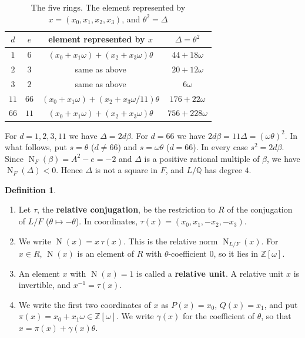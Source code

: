 \documentclass[a4paper,11pt]{article}
\theoremstyle{plain}
\theoremstyle{definition}
\newtheorem{definition}[theorem]{Definition}
\theoremstyle{remark}
\numberwithin{equation}{section}
\numberwithin{table}{section}
\newcommand{\Z}{\mathbb{Z}}
\newcommand{\Q}{\mathbb{Q}}
\newcommand{\Nm}{\operatorname{N}}
\newcommand{\NF}{\operatorname{N}_F}
\begin{document}
\begin{table}[htbp]
\centering
\caption{The five rings. The element represented by $x=(x_0,x_1,x_2,x_3)$, and $\theta^2=\Delta$}\label{tab:rings}
\begin{tabular}{cccc}
\toprule
$d$ & $e$ & element represented by $x$ & $\Delta=\theta^2$\\
\midrule
$1$ & $6$ & $(x_0+x_1\omega)+(x_2+x_3\omega)\theta$ & $44+18\omega$\\
$2$ & $3$ & same as above & $20+12\omega$\\
$3$ & $2$ & same as above & $6\omega$\\
$11$ & $66$ & $(x_0+x_1\omega)+(x_2+x_3\omega/11)\theta$ & $176+22\omega$\\
$66$ & $11$ & $(x_0+x_1\omega)+(x_2+x_3\omega)\theta$ & $756+228\omega$\\
\bottomrule
\end{tabular}
\end{table}

For $d=1,2,3,11$ we have $\Delta=2d\beta$. For $d=66$ we have $2d\beta=11\Delta=(\omega\theta)^2$.
In what follows, put $s=\theta$ ($d\ne66$) and $s=\omega\theta$ ($d=66$). In every case $s^2=2d\beta$. Since $\NF(\beta)=A^2-e=-2$ and $\Delta$ is a positive rational multiple of $\beta$, we have $\NF(\Delta)<0$. Hence $\Delta$ is not a square in $F$, and $L/\Q$ has degree $4$.

\begin{definition}
\begin{enumerate}
\item Let $\tau$, the \textbf{relative conjugation}, be the restriction to $R$ of the conjugation of $L/F$ ($\theta\mapsto-\theta$). In coordinates, $\tau(x)=(x_0,x_1,-x_2,-x_3)$.
\item We write $\Nm(x)=x\,\tau(x)$. This is the relative norm $\Nm_{L/F}(x)$. For $x\in R$, $\Nm(x)$ is an element of $R$ with $\theta$-coefficient $0$, so it lies in $\Z[\omega]$.
\item An element $x$ with $\Nm(x)=1$ is called a \textbf{relative unit}. A relative unit $x$ is invertible, and $x^{-1}=\tau(x)$.
\item We write the first two coordinates of $x$ as $P(x)=x_0$, $Q(x)=x_1$, and put $\pi(x)=x_0+x_1\omega\in\Z[\omega]$. We write $\gamma(x)$ for the coefficient of $\theta$, so that $x=\pi(x)+\gamma(x)\theta$.
\end{enumerate}
\end{definition}
\end{document}
